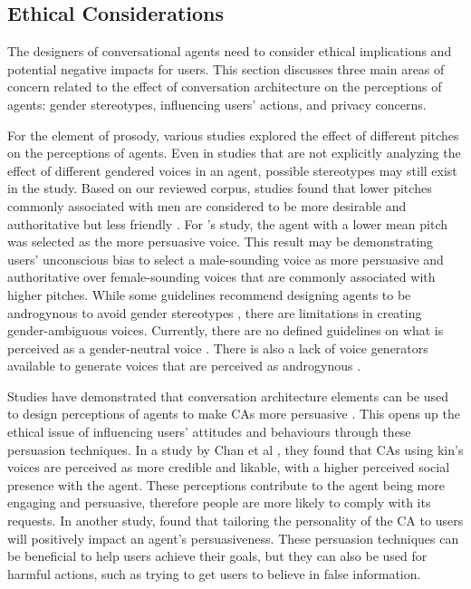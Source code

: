 \subsection{Ethical Considerations}

The designers of conversational agents need to consider ethical implications and potential negative impacts for users. This section discusses three main areas of concern related to the effect of conversation architecture on the perceptions of agents: gender stereotypes, influencing users' actions, and privacy concerns.

For the element of prosody, various studies explored the effect of different pitches on the perceptions of agents. Even in studies that are not explicitly analyzing the effect of different gendered voices in an agent, possible stereotypes may still exist in the study. Based on our reviewed corpus, studies found that lower pitches commonly associated with men are considered to be more desirable and authoritative but less friendly \cite{jestin2022effects, tolmeijer2021female}\cmt{[81][62]}. For \citet{dubiel2020persuasive}\cmt{[60]}'s study, the agent with a lower mean pitch was selected as the more persuasive voice. This result may be demonstrating users' unconscious bias to select a male-sounding voice as more persuasive and authoritative over female-sounding voices that are commonly associated with higher pitches. While some guidelines recommend designing agents to be androgynous to avoid gender stereotypes \cite{ruane2019conversational}, there are limitations in creating gender-ambiguous voices. Currently, there are no defined guidelines on what is perceived as a gender-neutral voice \cite{jestin2022effects}\cmt{[81]}. There is also a lack of voice generators available to generate voices that are perceived as androgynous \cite{tolmeijer2021female}\cmt{[62]}.

Studies have demonstrated that conversation architecture elements can be used to design perceptions of agents to make CAs more persuasive \cite{dubiel2020persuasive}\cmt{[60]}. This opens up the ethical issue of influencing users' attitudes and behaviours through these persuasion techniques. In a study by Chan et al \cite{chan2021kinvoices}\cmt{[74]}, they found that CAs using kin's voices are perceived as more credible and likable, with a higher perceived social presence with the agent. These perceptions contribute to the agent being more engaging and persuasive, therefore people are more likely to comply with its requests. In another study, \citet{andrews2012system}\cmt{[38]} found that tailoring the personality of the CA to users will positively impact an agent's persuasiveness. These persuasion techniques can be beneficial to help users achieve their goals, but they can also be used for harmful actions, such as trying to get users to believe in false information.


